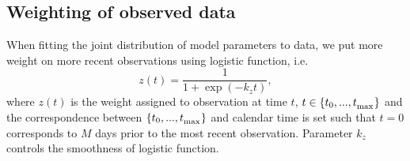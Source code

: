 \documentclass[11pt]{article}
\newcommand{\btheta}{\boldsymbol{\theta}}
\newcommand{\comments}[1]{[\textcolor{red}{#1}]}
\begin{document}
\subsection{Weighting of observed data} 

When fitting the joint distribution of model parameters to data, we put more weight on more recent observations using logistic function, i.e.
\begin{equation}
z(t) = \frac{1}{1 + \exp(- k_z t)}, 
\label{eq:datweight}
\end{equation}
where $z(t)$ is the weight assigned to observation at time $t$, $t \in \{t_0, ..., t_\textsubscript{max} \}$ and the correspondence between $\{t_0, ..., t_\textsubscript{max} \}$ and calendar time is set such that $t=0$ corresponds to $M$ days prior to the most recent observation. Parameter $k_z$ controls the smoothness of logistic function.

\end{document}
